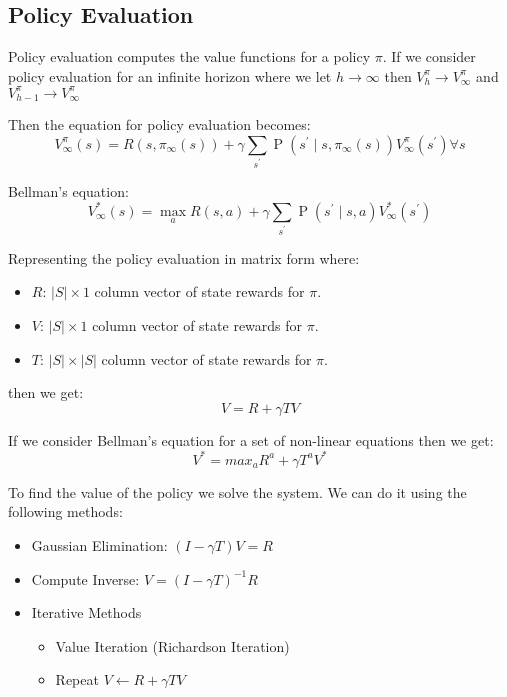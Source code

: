 \documentclass[12pt]{article}
\begin{document}
        \subsection{Policy Evaluation}
            Policy evaluation computes the value functions for a policy $\pi$. If we consider policy evaluation for an
            infinite horizon where we let $h \rightarrow \infty$ then $V_h^{\pi} \rightarrow V_{\infty}^{\pi}$ and
            $V_{h-1}^{\pi} \rightarrow V_{\infty}^{\pi}$
            
            Then the equation for policy evaluation becomes:
            $$V_{\infty}^{\pi}(s)=R\left(s, \pi_{\infty}(s)\right)+\gamma \sum_{s^{\prime}} \operatorname{P}\left(s^{\prime} \mid s, \pi_{\infty}(s)\right) V_{\infty}^{\pi}\left(s^{\prime}\right) \forall s$$

            Bellman's equation:
            $$V_{\infty}^{*}(s)=\max _{a} R(s, a)+\gamma \sum_{s^{\prime}} \operatorname{P}\left(s^{\prime} \mid s, a\right) V_{\infty}^{*}\left(s^{\prime}\right)$$

            Representing the policy evaluation in matrix form where:
            \begin{itemize}
                \item $R$: $|S| \times 1$ column vector of state rewards for $\pi$.
                \item $V$: $|S| \times 1$ column vector of state rewards for $\pi$.
                \item $T$: $|S| \times |S|$ column vector of state rewards for $\pi$.
            \end{itemize}

            then we get:
            $$ V = R + \gamma TV $$

            If we consider Bellman's equation for a set of non-linear equations then we get:
            $$ V^* = max_a R^a + \gamma T^a V^* $$

            To find the value of the policy we solve the system. We can do it using the following
            methods:

            \begin{itemize}
                \item Gaussian Elimination: $(I - \gamma T)V = R$
                \item Compute Inverse: $V = (I - \gamma T)^{-1}R$
                \item Iterative Methods \begin{itemize}
                    \item Value Iteration (Richardson Iteration)
                    \item Repeat $V \gets R + \gamma TV$
                \end{itemize}
            \end{itemize}
            
\end{document}

